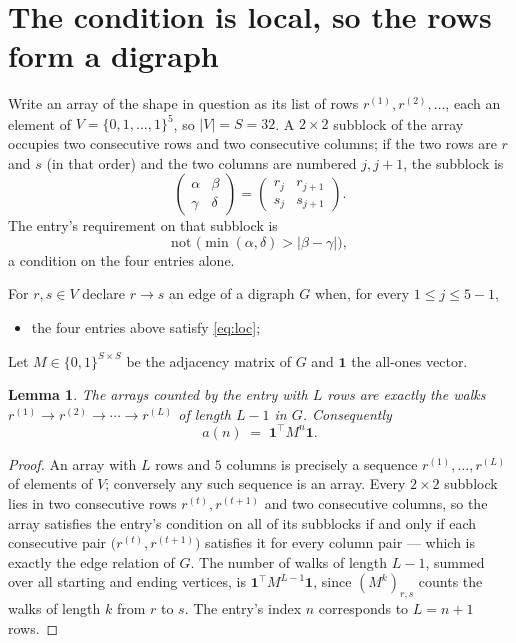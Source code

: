 \documentclass[11pt,a4paper]{article}
\theoremstyle{plain}
\newtheorem{lemma}[theorem]{Lemma}
\theoremstyle{definition}
\begin{document}
\section{The condition is local, so the rows form a digraph}

Write an array of the shape in question as its list of rows
$r^{(1)},r^{(2)},\dots$, each an element of
$V=\{0,1,\dots,1\}^{5}$, so $|V|=S=32$. A $2\times2$ subblock of the array
occupies two consecutive rows and two consecutive columns; if the two rows are $r$
and $s$ (in that order) and the two columns are numbered $j,j+1$,
the subblock is
\[
\begin{pmatrix}\alpha&\beta\\\gamma&\delta\end{pmatrix}=\begin{pmatrix}r_j&r_{j+1}\\s_j&s_{j+1}\end{pmatrix}.
\]
The entry's requirement on that subblock is
\begin{equation}\label{eq:loc}
\text{not }\bigl(\min(\alpha,\delta)>|\beta-\gamma|\bigr),
\end{equation}
a condition on the four entries alone.

For $r,s\in V$ declare $r\to s$ an edge of a digraph $G$ when, for every
$1\le j\le 5-1$,
\begin{itemize}
\item the four entries above satisfy \eqref{eq:loc};

\end{itemize}
Let $M\in\{0,1\}^{S\times S}$ be the adjacency matrix of $G$ and $\mathbf{1}$ the
all-ones vector.

\begin{lemma}\label{lem:walk}
The arrays counted by the entry with $L$ rows are exactly the walks
$r^{(1)}\to r^{(2)}\to\cdots\to r^{(L)}$ of length $L-1$ in $G$. Consequently
\[
a(n)\;=\;\mathbf{1}^{\!\top}M^{n}\mathbf{1} .
\]
\end{lemma}

\begin{proof}
An array with $L$ rows and $5$ columns is precisely a sequence
$r^{(1)},\dots,r^{(L)}$ of elements of $V$; conversely any such sequence is an array.
Every $2\times2$ subblock lies in two consecutive rows $r^{(t)},r^{(t+1)}$ and two
consecutive columns, so the array satisfies the entry's condition on all of its subblocks
if and only if each consecutive pair $\bigl(r^{(t)},r^{(t+1)}\bigr)$ satisfies it for
every column pair --- which is exactly the edge relation of $G$. The number of walks of
length $L-1$, summed over all starting and ending vertices, is
$\mathbf{1}^{\!\top}M^{L-1}\mathbf{1}$, since $(M^{k})_{r,s}$ counts the walks of
length $k$ from $r$ to $s$. The entry's index $n$ corresponds to $L=n+1$ rows.
\end{proof}
\end{document}
